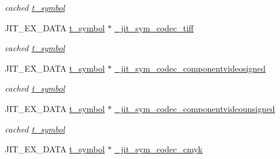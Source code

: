 \begin{DoxyCompactItemize}
\begin{DoxyCompactList}\small\item\em cached \hyperlink{structt__symbol}{t\_\-symbol} \item\end{DoxyCompactList}\item 
\hypertarget{group__jitter_ga1f8a279a6ad561887c1d6f4cad544040}{
JIT\_\-EX\_\-DATA \hyperlink{structt__symbol}{t\_\-symbol} $\ast$ \hyperlink{group__jitter_ga1f8a279a6ad561887c1d6f4cad544040}{\_\-jit\_\-sym\_\-codec\_\-tiff}}
\label{group__jitter_ga1f8a279a6ad561887c1d6f4cad544040}

\begin{DoxyCompactList}\small\item\em cached \hyperlink{structt__symbol}{t\_\-symbol} \item\end{DoxyCompactList}\item 
\hypertarget{group__jitter_gae19cd60b6c0aee556e197bfe57763998}{
JIT\_\-EX\_\-DATA \hyperlink{structt__symbol}{t\_\-symbol} $\ast$ \hyperlink{group__jitter_gae19cd60b6c0aee556e197bfe57763998}{\_\-jit\_\-sym\_\-codec\_\-componentvideosigned}}
\label{group__jitter_gae19cd60b6c0aee556e197bfe57763998}

\begin{DoxyCompactList}\small\item\em cached \hyperlink{structt__symbol}{t\_\-symbol} \item\end{DoxyCompactList}\item 
\hypertarget{group__jitter_gad14a48bc61f3746eea15daadd1353651}{
JIT\_\-EX\_\-DATA \hyperlink{structt__symbol}{t\_\-symbol} $\ast$ \hyperlink{group__jitter_gad14a48bc61f3746eea15daadd1353651}{\_\-jit\_\-sym\_\-codec\_\-componentvideounsigned}}
\label{group__jitter_gad14a48bc61f3746eea15daadd1353651}

\begin{DoxyCompactList}\small\item\em cached \hyperlink{structt__symbol}{t\_\-symbol} \item\end{DoxyCompactList}\item 
\hypertarget{group__jitter_ga39d0ef75961249b5815622e6eae46c66}{
JIT\_\-EX\_\-DATA \hyperlink{structt__symbol}{t\_\-symbol} $\ast$ \hyperlink{group__jitter_ga39d0ef75961249b5815622e6eae46c66}{\_\-jit\_\-sym\_\-codec\_\-cmyk}}
\label{group__jitter_ga39d0ef75961249b5815622e6eae46c66}


\end{DoxyCompactItemize}
